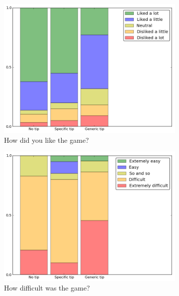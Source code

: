 \documentclass{sig-alternate}
\begin{document}
\begin{figure}[ht]
\centering
\begin{subfigure}[t]{0.3\textwidth}
	\includegraphics[scale=0.26]{img/liked}
	\caption{How did you like the game?}
    \label{figure:survey:liked}
\end{subfigure}
\begin{subfigure}[t]{0.3\textwidth}
	\includegraphics[scale=0.26]{img/difficult}
	\caption{How difficult was the game?}
    \label{figure:survey:difficult}
\end{subfigure}
\begin{subfigure}[t]{0.3\textwidth}

\end{subfigure}
\end{figure}
\end{document}
